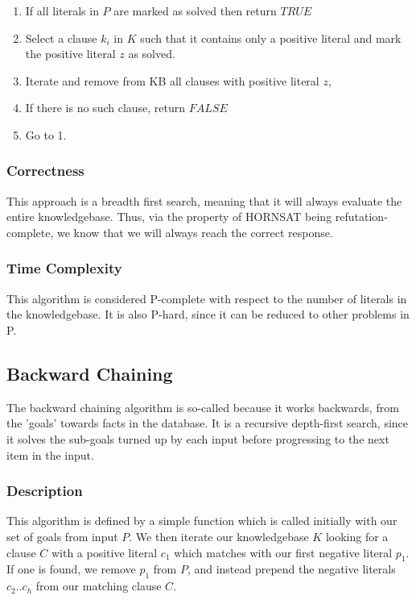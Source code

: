 \documentclass{article}
\begin{document}
\begin{enumerate}
  \item If all literals in $P$ are marked as solved then return $TRUE$
  \item Select a clause $k_i$ in $K$ such that it contains only a positive
  literal and mark the positive literal $z$ as solved.
  \item Iterate and remove from KB all clauses with positive literal $z$,
  \item If there is no such clause, return $FALSE$
  \item Go to 1.
\end{enumerate}

\subsubsection{Correctness}

This approach is a breadth first search, meaning that it will always evaluate
the entire knowledgebase. Thus, via the property of HORNSAT being
refutation-complete, we know that we will always reach the correct response.

\subsubsection{Time Complexity}

This algorithm is considered P-complete with respect to the number of literals
in the knowledgebase. It is also P-hard, since it can be reduced to other
problems in P.

\subsection{Backward Chaining}

The backward chaining algorithm is so-called because it works backwards, from the
'goals' towards facts in the database. It is a recursive depth-first search, since 
it solves the sub-goals turned up by each input before progressing to the next 
item in the input.

\subsubsection{Description}

This algorithm is defined by a simple function which is called initially with
our set of goals from input $P$. We then iterate our knowledgebase $K$ looking for a
clause $C$ with a positive literal $c_1$ which matches with our first negative
literal $p_1$. If one is found, we remove $p_1$ from $P$, and instead prepend
the negative literals $c_2 .. c_h$ from our matching clause $C$.
\end{document}
